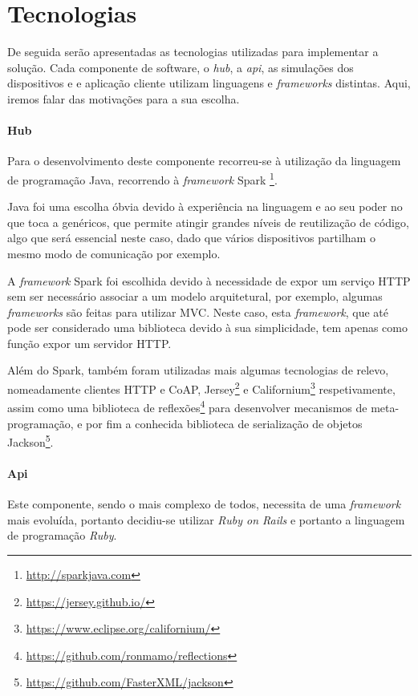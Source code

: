 \section{Tecnologias}
De seguida serão apresentadas as tecnologias utilizadas para implementar a solução. Cada componente de software, o \textit{hub}, a \textit{api}, as simulações dos dispositivos e e aplicação cliente utilizam linguagens e \textit{frameworks} distintas. Aqui, iremos falar das motivações para a sua escolha.

\paragraph*{Hub}
Para o desenvolvimento deste componente recorreu-se à utilização da linguagem de programação Java, recorrendo à \textit{framework} Spark \footnote{\url{http://sparkjava.com}}.

Java foi uma escolha óbvia devido à experiência na linguagem e ao seu poder no que toca a genéricos, que permite atingir grandes níveis de reutilização de código, algo que será essencial neste caso, dado que vários dispositivos partilham o mesmo modo de comunicação por exemplo.

A \textit{framework} Spark foi escolhida devido à necessidade de expor um serviço HTTP sem ser necessário associar a um modelo arquitetural, por exemplo, algumas \textit{frameworks} são feitas para utilizar MVC. Neste caso, esta \textit{framework}, que até pode ser considerado uma biblioteca devido à sua simplicidade, tem apenas como função expor um servidor HTTP.

Além do Spark, também foram utilizadas mais algumas tecnologias de relevo, nomeadamente clientes HTTP e CoAP, Jersey\footnote{\url{https://jersey.github.io/}} e Californium\footnote{\url{https://www.eclipse.org/californium/}} respetivamente, assim como uma biblioteca de reflexões\footnote{\url{https://github.com/ronmamo/reflections}} para desenvolver mecanismos de meta-programação, e por fim a conhecida biblioteca de serialização de objetos Jackson\footnote{\url{https://github.com/FasterXML/jackson}}.

\paragraph*{Api}
Este componente, sendo o mais complexo de todos, necessita de uma \textit{framework} mais evoluída, portanto decidiu-se utilizar \textit{Ruby on Rails} e portanto a linguagem de programação \textit{Ruby}.

